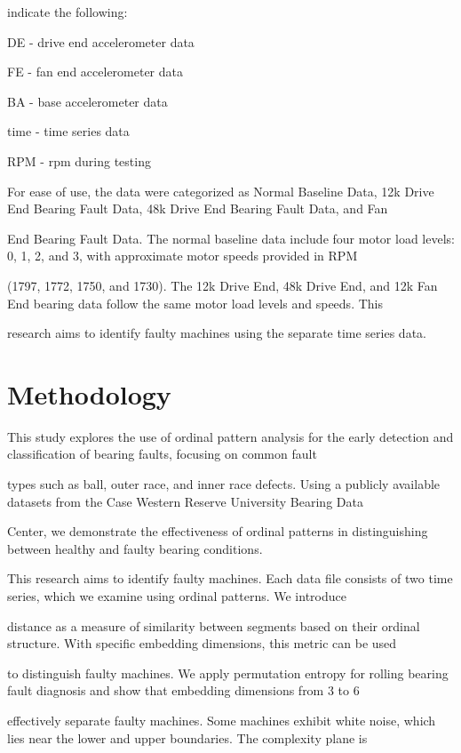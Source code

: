 \documentclass[a0,portrait]{a0poster}
\begin{document}
\begin{mdframed}[style=MyFrame]
\begin{multicols}{2}
indicate the following:

	\item DE - drive end accelerometer data
	\item FE - fan end accelerometer data
	\item BA - base accelerometer data
	\item time - time series data
	\item RPM - rpm during testing

For ease of use, the data were categorized as Normal Baseline Data, 12k Drive End Bearing Fault Data, 48k Drive End Bearing Fault Data, and Fan

End Bearing Fault Data. The normal baseline data include four motor load levels: 0, 1, 2, and 3, with approximate motor speeds provided in RPM
 
(1797, 1772, 1750, and 1730). The 12k Drive End, 48k Drive End, and 12k Fan End bearing data follow the same motor load levels and speeds. This

research aims to identify faulty machines using the separate time series data.

\section{Methodology}\label{section2}

This study explores the use of ordinal pattern analysis for the early detection and classification of bearing faults, focusing on common fault 

types such as ball, outer race, and inner race defects. Using a publicly available datasets from the Case Western Reserve University Bearing Data 

Center, we demonstrate the effectiveness of ordinal patterns in distinguishing between healthy and faulty bearing conditions.

This research aims to identify faulty machines. Each data file consists of two time series, which we examine using ordinal patterns. We introduce 

distance as a measure of similarity between segments based on their ordinal structure. With specific embedding dimensions, this metric can be used 

to distinguish faulty machines. We apply permutation entropy for rolling bearing fault diagnosis and show that embedding dimensions from 3 to 6 

effectively separate faulty machines. Some machines exhibit white noise, which lies near the lower and upper boundaries. The complexity plane is


\end{multicols}
\end{mdframed}
\end{document}
